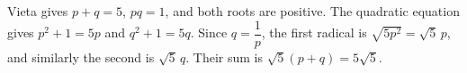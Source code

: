 Vieta gives $p+q=5$, $pq=1$, and both roots are positive. The quadratic equation gives $p^2+1=5p$ and $q^2+1=5q$. Since $q=\dfrac{1}{p}$, the first radical is $\sqrt{5p^2}=\sqrt5\,p$, and similarly the second is $\sqrt5\,q$. Their sum is $\sqrt5(p+q)=\boxed{5\sqrt5}$.
